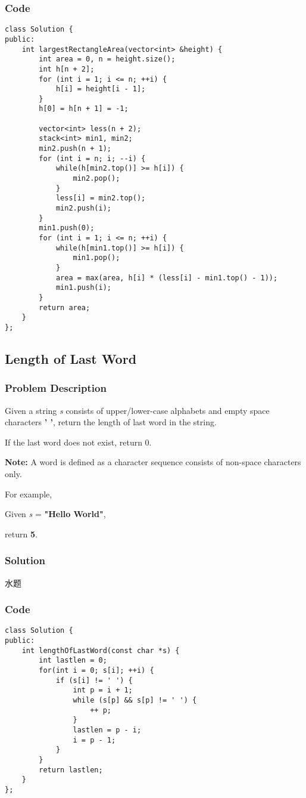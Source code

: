 \documentclass[courier]{article}
\begin{document}
\begin{CJK*}{UTF8}{gkai}
\subsubsection*{Code}
\begin{lstlisting}
class Solution {
public:
    int largestRectangleArea(vector<int> &height) {
        int area = 0, n = height.size();
        int h[n + 2];
        for (int i = 1; i <= n; ++i) {
            h[i] = height[i - 1];
        }
        h[0] = h[n + 1] = -1;
        
        vector<int> less(n + 2);
        stack<int> min1, min2;
        min2.push(n + 1);
        for (int i = n; i; --i) {
            while(h[min2.top()] >= h[i]) {
                min2.pop();
            }
            less[i] = min2.top();
            min2.push(i);
        }
        min1.push(0);
        for (int i = 1; i <= n; ++i) {
            while(h[min1.top()] >= h[i]) {
                min1.pop();
            }
            area = max(area, h[i] * (less[i] - min1.top() - 1));
            min1.push(i);
        }
        return area;
    }
}; 
\end{lstlisting}


\subsection{ Length of Last Word }

\subsubsection*{Problem Description}
Given a string \emph{s} consists of upper/lower-case alphabets and empty space characters \textbf{' '}, return the length of last word in the string.

If the last word does not exist, return 0.

\textbf{Note:} A word is defined as a character sequence consists of non-space characters only.

For example, 


Given \emph{s} = \textbf{"Hello World"},


return \textbf{5}.



\subsubsection*{Solution}
水题

\subsubsection*{Code}
\begin{lstlisting}
class Solution {
public:
    int lengthOfLastWord(const char *s) {
        int lastlen = 0;
        for(int i = 0; s[i]; ++i) {
            if (s[i] != ' ') {
                int p = i + 1;
                while (s[p] && s[p] != ' ') {
                    ++ p;
                }
                lastlen = p - i;
                i = p - 1;
            }
        }
        return lastlen;
    }
};



\end{lstlisting}
\end{CJK*}
\end{document}
